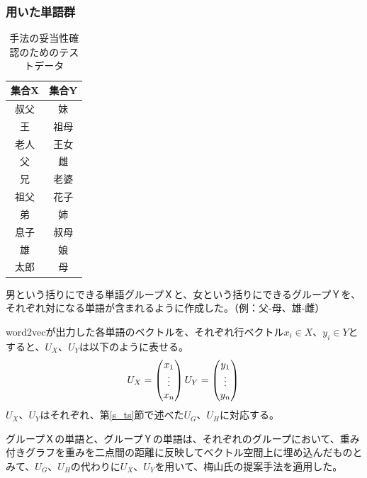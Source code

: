 \subsubsection{用いた単語群}
\begin{table}[h]
  \centering
  \caption[テストデータ]{手法の妥当性確認のためのテストデータ}
  \begin{tabular}{|c||c|} \hline
    集合X & 集合Y \\ \hline \hline
    叔父 & 妹 \\
    王 & 祖母 \\
    老人 & 王女 \\
    父 & 雌 \\
    兄 & 老婆 \\
    祖父 & 花子 \\
    弟 & 姉 \\
    息子 & 叔母 \\
    雄 & 娘 \\
    太郎 & 母 \\ \hline
  \end{tabular}
\end{table}
男という括りにできる単語グループＸと、女という括りにできるグループＹを、それぞれ対になる単語が含まれるように作成した。（例：父-母、雄-雌）

word2vecが出力した各単語のベクトルを、それぞれ行ベクトル$x_i\in X$、$y_i\in Y$とすると、$U_X$、$U_Y$は以下のように表せる。
\begin{equation}
  U_X=\begin{pmatrix}
    x_1 \\
    \vdots \\
    x_n
  \end{pmatrix} \notag \\
  U_Y=\begin{pmatrix}
    y_1 \\
    \vdots \\
    y_n
  \end{pmatrix} \notag \\
\end{equation}
$U_X$、$U_Y$はそれぞれ、第\ref{s_ts}節で述べた$U_G$、$U_H$に対応する。

グループＸの単語と、グループＹの単語は、それぞれのグループにおいて、重み付きグラフを重みを二点間の距離に反映してベクトル空間上に埋め込んだものとみて、$U_G$、$U_H$の代わりに$U_X$、$U_Y$を用いて、梅山氏の提案手法を適用した。

